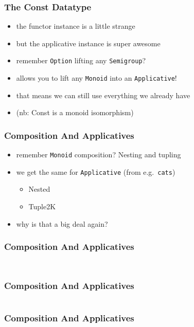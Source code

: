 \documentclass[aspectratio=169]{beamer}
\begin{document}
\begin{frame}
  \frametitle{The Const Datatype}
  \begin{itemize}
  \item the functor instance is a little strange
  \item but the applicative instance is super awesome
  \item remember \texttt{Option} lifting any \texttt{Semigroup}?
  \item allows you to lift any \texttt{Monoid} into an \texttt{Applicative}!
  \item that means we can still use everything we already have
  \item (nb: Const is a monoid isomorphism)
  \end{itemize}
\end{frame}

\begin{frame}
  \frametitle{Composition And Applicatives}
  \begin{itemize}
  \item remember \texttt{Monoid} composition? Nesting and tupling
  \item we get the same for \texttt{Applicative} (from e.g.\ \texttt{cats})
    \begin{itemize}
    \item Nested
    \item Tuple2K
    \end{itemize}
  \item why is that a big deal again?
  \end{itemize}
\end{frame}

\begin{frame}[fragile]
  \frametitle{Composition And Applicatives}
  \inputminted[fontsize=\small]{scala}{snippets/compose-applicative-monoid.scala}
  \inputminted[fontsize=\small]{scala}{snippets/compose-applicative-1.scala}
\end{frame}

\begin{frame}[fragile]
  \frametitle{Composition And Applicatives}
  \inputminted[fontsize=\small]{scala}{snippets/compose-applicative-2.scala}
\end{frame}

\begin{frame}[fragile]
  \frametitle{Composition And Applicatives}
  \begin{center}
  \end{center}
\end{frame}
\end{document}
